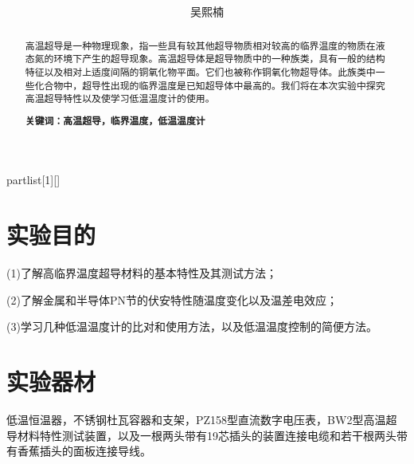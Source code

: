 \documentclass[UTF8]{ctexart}
\author{
	吴熙楠}
\title{
	\heiti{高温超导材料特性测试及低温温度计}
}
\begin{document}
	\maketitle
	\newtheorem{definition}{定义}[subsection]
	\newtheorem{function}{公式}[subsection]
	\newtheorem{summary}{小结}[subsection]
	\newtheorem{deduction}{推论}[subsection]
	\newtheorem{property}{性质}[subsection]
	\newtheorem{theo}{定理}[subsection]
	\newtheorem{step}{步骤}[subsection]
	\newtheorem{remark}{注记}[subsection]
	\newtheorem{proof}{证明}[subsection]
	\newenvironment{Theorem}[1][]{\par\noindent\textbf{定理}(#1)\quad}{\par}
	\newcommand{\rbra}[1]{\left( #1 \right)}
	\newcommand{\sbra}[1]{\left[ #1 \right]}
	\newcommand{\cbra}[1]{\left\{ #1 \right\}}
	\newcommand{\pbra}[1]{\left< #1 \right>}
	\newcommand{\abs}[1]{\left| #1 \right|}
	\newcommand{\fs}[2]{\displaystyle\frac{#1}{#2}}
	
	\newenvironment{myproof}{{\color{blue}证：}}
	
	\newenvironment{partlist}[1][]
	{\begin{enumerate}[itemsep=0pt, label=(\arabic*), wide, labelindent=\parindent, listparindent=\parindent, #1]}
		{\end{enumerate}}
	
	\renewcommand{\contentsname}{目录} %
	\tableofcontents
	\newpage
	\renewcommand{\abstractname}{\large 摘要\\}
	\begin{abstract}
		高温超导是一种物理现象，指一些具有较其他超导物质相对较高的临界温度的物质在液态氮的环境下产生的超导现象。高温超导体是超导物质中的一种族类，具有一般的结构特征以及相对上适度间隔的铜氧化物平面。它们也被称作铜氧化物超导体。此族类中一些化合物中，超导性出现的临界温度是已知超导体中最高的。我们将在本次实验中探究高温超导特性以及使学习低温温度计的使用。

		\textbf{关键词：高温超导，临界温度，低温温度计}
	\end{abstract}
	\section{实验目的}
	(1)了解高临界温度超导材料的基本特性及其测试方法；
	\par (2)了解金属和半导体PN节的伏安特性随温度变化以及温差电效应；
	\par (3)学习几种低温温度计的比对和使用方法，以及低温温度控制的简便方法。
	\section{实验器材}
	低温恒温器，不锈钢杜瓦容器和支架，PZ158型直流数字电压表，BW2型高温超导材料特性测试装置，以及一根两头带有19芯插头的装置连接电缆和若干根两头带有香蕉插头的面板连接导线。
\end{document}
